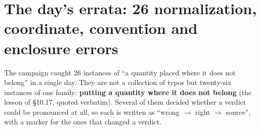 \section{The day's errata: 26 normalization, coordinate, convention and enclosure errors}
\label{sec:errata}

The campaign caught 26 instances of ``a quantity placed where it does not belong'' in a single day.
They are not a collection of typos but twenty-six instances of one family: \textbf{putting a quantity
where it does not belong} (the lesson of  \S10.17, quoted verbatim). Several of
them decided whether a verdict could be pronounced at all, so each is written as
``wrong $\to$ right $\to$ source'', with a marker for the ones that changed a verdict.


